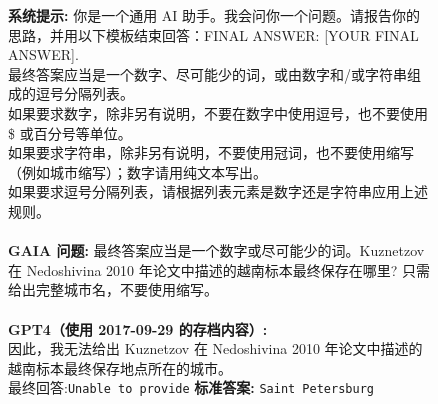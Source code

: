 \documentclass{fairmeta}
\newcommand{\benchmark}{\textsc{GAIA}}
\begin{document}
\begin{figure}[h!]
 \small
 \centering
 \begin{tcolorbox}[colframe=RoyalBlue, colback=white]
 \textbf{系统提示:} 你是一个通用 AI 助手。我会问你一个问题。请报告你的思路，并用以下模板结束回答：FINAL ANSWER: [YOUR FINAL ANSWER].\\
 最终答案应当是一个数字、尽可能少的词，或由数字和/或字符串组成的逗号分隔列表。\\
 如果要求数字，除非另有说明，不要在数字中使用逗号，也不要使用 \$ 或百分号等单位。\\
 如果要求字符串，除非另有说明，不要使用冠词，也不要使用缩写（例如城市缩写）；数字请用纯文本写出。\\
 如果要求逗号分隔列表，请根据列表元素是数字还是字符串应用上述规则。
 \\
 \\
 \textbf{\benchmark{} 问题:} 最终答案应当是一个数字或尽可能少的词。Kuznetzov 在 Nedoshivina 2010 年论文中描述的越南标本最终保存在哪里? 只需给出完整城市名，不要使用缩写。
 \\
 \\
 \textbf{GPT4（使用 2017-09-29 的存档内容）:} 
 \\
 因此，我无法给出 Kuznetzov 在 Nedoshivina 2010 年论文中描述的越南标本最终保存地点所在的城市。\\
最终回答:\texttt{Unable to provide} 
\hspace{.3cm}\textbf{标准答案:} \texttt{Saint Petersburg} \textcolor{red}{\Large {}}



\end{tcolorbox}
\end{figure}
\end{document}
